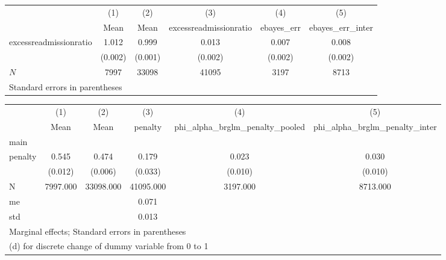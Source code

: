 \begin{tabular}{l*{5}{c}}
\hline\hline
            &\multicolumn{1}{c}{(1)}&\multicolumn{1}{c}{(2)}&\multicolumn{1}{c}{(3)}&\multicolumn{1}{c}{(4)}&\multicolumn{1}{c}{(5)}\\
            &\multicolumn{1}{c}{Mean}&\multicolumn{1}{c}{Mean}&\multicolumn{1}{c}{excessreadmissionratio}&\multicolumn{1}{c}{ebayes\_err}&\multicolumn{1}{c}{ebayes\_err\_inter}\\
\hline
excessreadmissionratio&       1.012&       0.999&       0.013&       0.007&       0.008\\
            &     (0.002)&     (0.001)&     (0.002)&     (0.002)&     (0.002)\\
\hline
\(N\)       &        7997&       33098&       41095&        3197&        8713\\
\hline\hline
\multicolumn{6}{l}{\footnotesize Standard errors in parentheses}\\
\end{tabular}
\begin{tabular}{l*{5}{c}}
\hline\hline
            &\multicolumn{1}{c}{(1)}&\multicolumn{1}{c}{(2)}&\multicolumn{1}{c}{(3)}&\multicolumn{1}{c}{(4)}&\multicolumn{1}{c}{(5)}\\
            &\multicolumn{1}{c}{Mean}&\multicolumn{1}{c}{Mean}&\multicolumn{1}{c}{penalty}&\multicolumn{1}{c}{phi\_alpha\_brglm\_penalty\_pooled}&\multicolumn{1}{c}{phi\_alpha\_brglm\_penalty\_inter}\\
\hline
main        &            &            &            &            &            \\
penalty     &       0.545&       0.474&       0.179&       0.023&       0.030\\
            &     (0.012)&     (0.006)&     (0.033)&     (0.010)&     (0.010)\\
\hline
N           &    7997.000&   33098.000&   41095.000&    3197.000&    8713.000\\
me          &            &            &       0.071&            &            \\
std         &            &            &       0.013&            &            \\
\hline\hline
\multicolumn{6}{l}{\footnotesize Marginal effects; Standard errors in parentheses}\\
\multicolumn{6}{l}{\footnotesize  (d) for discrete change of dummy variable from 0 to 1}\\
\end{tabular}
